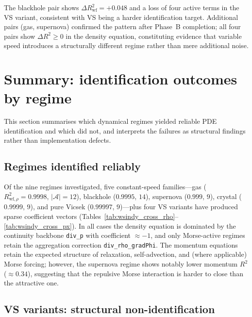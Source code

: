 The blackhole pair shows
$\Delta R^2_{\text{wf}} = +0.048$ and a loss of four active terms in
the VS variant, consistent with VS being a harder identification target.
Additional pairs (gas, supernova) confirmed the pattern after
Phase~B completion; all four pairs show $\Delta R^2 \geq 0$ in the
density equation, constituting evidence that variable speed
introduces a structurally different regime rather than mere additional
noise.

\section{Summary: identification outcomes by regime}
\label{sec:wsindy_outcomes}

This section summarises which dynamical regimes yielded reliable PDE identification
and which did not, and interprets the failures as structural findings rather
than implementation defects.

\subsection{Regimes identified reliably}
\label{subsec:outcomes_reliable}

Of the nine regimes investigated, five constant-speed
families---gas ($R^2_{\text{wf},\rho}=0.9998$, $|\mathcal{A}|=12$),
blackhole ($0.9995$, $14$),
supernova ($0.999$, $9$),
crystal ($0.9999$, $9$),
and pure Vicsek ($0.99997$, $9$)---plus four VS
variants have produced sparse coefficient
vectors (Tables~\ref{tab:wsindy_cross_rho}--\ref{tab:wsindy_cross_px}).
In all cases the density equation is dominated by the continuity backbone
\texttt{div\_p} with coefficient $\approx -1$, and only
Morse-active regimes retain the aggregation correction
\texttt{div\_rho\_gradPhi}.  The momentum equations retain the expected
structure of relaxation, self-advection, and
(where applicable) Morse forcing; however, the supernova regime shows
notably lower momentum $R^2$ ($\approx 0.34$), suggesting that the
repulsive Morse interaction is harder to close than the attractive one.

\subsection{VS variants: structural non-identification}
\label{subsec:outcomes_vs}

